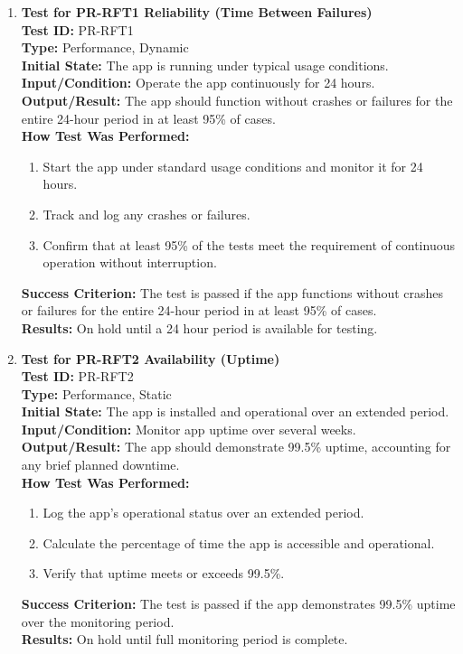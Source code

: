 \documentclass[12pt, titlepage]{article}
\begin{document}
\begin{enumerate}
    \item \textbf{Test for PR-RFT1 Reliability (Time Between Failures)} \\
      \newline
      \textbf{Test ID:} PR-RFT1 \\
      \textbf{Type:} Performance, Dynamic \\
      \textbf{Initial State:} The app is running under typical usage conditions. \\
      \textbf{Input/Condition:} Operate the app continuously for 24 hours. \\
      \textbf{Output/Result:} The app should function without crashes or failures for the entire 24-hour period in at least 
      95\% of cases. \\
      \textbf{How Test Was Performed:}
      \begin{enumerate}
          \item Start the app under standard usage conditions and monitor it for 24 hours.
          \item Track and log any crashes or failures.
          \item Confirm that at least 95\% of the tests meet the requirement of continuous operation without interruption.
      \end{enumerate}
      \textbf{Success Criterion:} The test is passed if the app functions without crashes or failures for the entire 24-hour period
      in at least 95\% of cases. \\
      \textbf{Results:} On hold until a 24 hour period is available for testing.\\
      
    \item \textbf{Test for PR-RFT2 Availability (Uptime)} \\
      \newline
      \textbf{Test ID:} PR-RFT2 \\
      \textbf{Type:} Performance, Static \\
      \textbf{Initial State:} The app is installed and operational over an extended period. \\
      \textbf{Input/Condition:} Monitor app uptime over several weeks. \\
      \textbf{Output/Result:} The app should demonstrate 99.5\% uptime, accounting for any brief planned downtime. \\
      \textbf{How Test Was Performed:}
      \begin{enumerate}
          \item Log the app’s operational status over an extended period.
          \item Calculate the percentage of time the app is accessible and operational.
          \item Verify that uptime meets or exceeds 99.5\%.
      \end{enumerate}
      \textbf{Success Criterion:} The test is passed if the app demonstrates 99.5\% uptime over the monitoring period.\\
      \textbf{Results:} On hold until full monitoring period is complete.\\


\end{enumerate}
\end{document}
